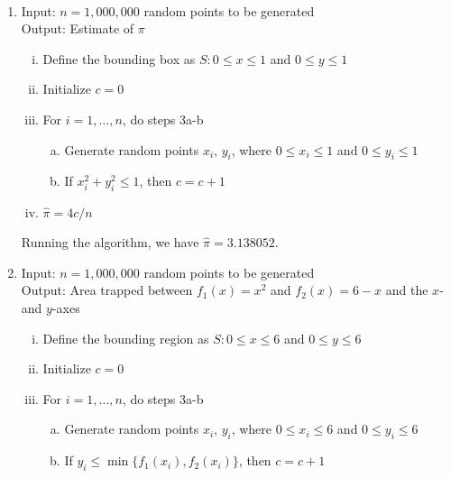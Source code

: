 \documentclass[10pt]{report}
\title{
	\courseTitle\\
	\hwNo\\
	\hwDate
}
\author{\hwAuther}
\date{}
\begin{document}
\maketitle

\begin{enumerate}
	\item 
	Input: $n=1,000,000$ random points to be generated\\
	Output: Estimate of $\pi$
	\begin{enumerate}[i.]
		\item
		Define the bounding box as $S: 0 \le x \le 1$ and $0 \le y \le 1$
		
		\item
		Initialize $c=0$
		
		\item
		For $i=1, \dots, n$, do steps 3a-b
		\begin{enumerate}[a.]
			\item 
			Generate random points $x_i$, $y_i$, where $0 \le x_i \le 1$ and $0 \le y_i \le 1$
			
			\item 
			If $x_i^2 + y_i^2 \le 1$, then $c=c+1$
		\end{enumerate}
	
		\item
		$\hat{\pi} = 4c/n$
	\end{enumerate}
	Running the algorithm, we have $\hat{\pi} = 3.138052$.
	
	\item 
	Input: $n=1,000,000$ random points to be generated\\
	Output: Area trapped between $f_1(x) = x^2$ and $f_2(x) = 6-x$ and the $x$- and $y$-axes
	\begin{enumerate}[i.]
		\item
		Define the bounding region as $S: 0 \le x \le 6$ and $0 \le y \le 6$
		
		\item
		Initialize $c=0$
		
		\item
		For $i=1, \dots, n$, do steps 3a-b
		\begin{enumerate}[a.]
			\item 
			Generate random points $x_i$, $y_i$, where $0 \le x_i \le 6$ and $0 \le y_i \le 6$
			
			\item 
			If $y_i \le \min\{f_1(x_i), f_2(x_i)\}$, then $c=c+1$
		\end{enumerate}
		

\end{enumerate}
\end{enumerate}
\end{document}
